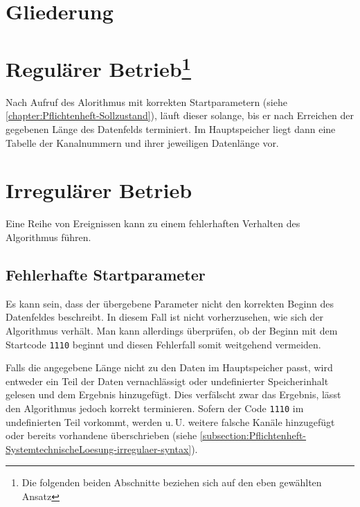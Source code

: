 

\section{Gliederung}
\label{section:Pflichtenheft-SystemtechnischeLoesung-Gliederung}



\section[Regulärer Betrieb]{Regulärer Betrieb\footnote{Die folgenden beiden Abschnitte beziehen sich auf den eben gewählten Ansatz}}
\label{section:Pflichtenheft-SystemtechnischeLoesung-regulaer}

Nach Aufruf des Alorithmus mit korrekten Startparametern (siehe \autoref{chapter:Pflichtenheft-Sollzustand}), läuft dieser solange, bis er nach Erreichen der gegebenen Länge des Datenfelds terminiert. Im Hauptspeicher liegt dann eine Tabelle der Kanalnummern und ihrer jeweiligen Datenlänge vor.


\section{Irregulärer Betrieb}
\label{section:Pflichtenheft-SystemtechnischeLoesung-irregulaer}

Eine Reihe von Ereignissen kann zu einem fehlerhaften Verhalten des Algorithmus führen.

\subsection{Fehlerhafte Startparameter}
\label{subsection:Pflichtenheft-SystemtechnischeLoesung-irregulaer-startparameter}

Es kann sein, dass der übergebene Parameter nicht den korrekten Beginn des Datenfeldes beschreibt. In diesem Fall ist nicht vorherzusehen, wie sich der Algorithmus verhält. Man kann allerdings überprüfen, ob der Beginn mit dem Startcode \texttt{1110} beginnt und diesen Fehlerfall somit weitgehend vermeiden.

Falls die angegebene Länge nicht zu den Daten im Hauptspeicher passt, wird entweder ein Teil der Daten vernachlässigt oder undefinierter Speicherinhalt gelesen und dem Ergebnis hinzugefügt. Dies verfälscht zwar das Ergebnis, lässt den Algorithmus jedoch korrekt terminieren. Sofern der Code \texttt{1110} im undefinierten Teil vorkommt, werden u.\,U. weitere falsche Kanäle hinzugefügt oder bereits vorhandene überschrieben (siehe \autoref{subsection:Pflichtenheft-SystemtechnischeLoesung-irregulaer-syntax}).

